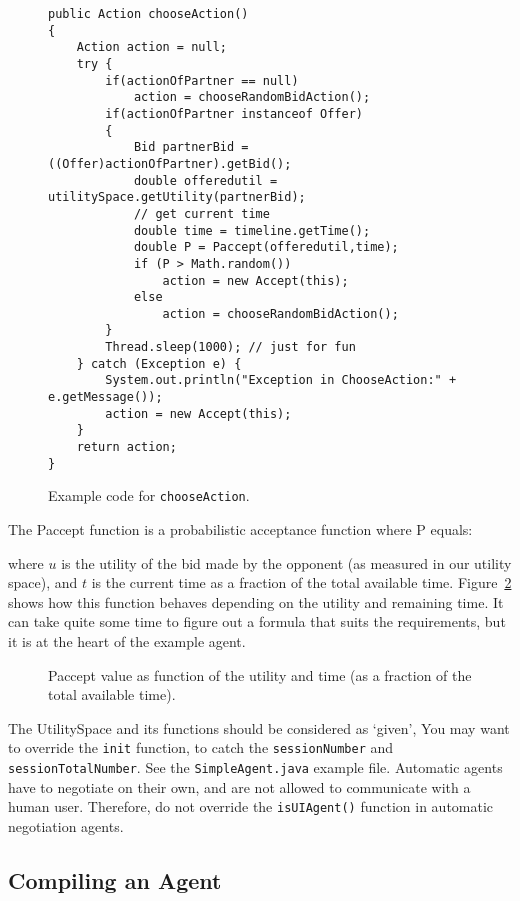 \documentclass[]{article}
\begin{document}
\begin{figure}
\begin{lstlisting}
public Action chooseAction()
{
	Action action = null;
	try { 
		if(actionOfPartner == null) 
			action = chooseRandomBidAction();
		if(actionOfPartner instanceof Offer)
		{
			Bid partnerBid = ((Offer)actionOfPartner).getBid();
			double offeredutil = utilitySpace.getUtility(partnerBid);
			// get current time
			double time = timeline.getTime();
			double P = Paccept(offeredutil,time);
			if (P > Math.random())
				action = new Accept(this);
			else
				action = chooseRandomBidAction();
		}
		Thread.sleep(1000); // just for fun
	} catch (Exception e) { 
		System.out.println("Exception in ChooseAction:" + e.getMessage());
		action = new Accept(this); 
	}
	return action;
}
\end{lstlisting}
\caption{Example code for \texttt{chooseAction}.}\label{Code:chooseAction}
\end{figure}

The Paccept function is a probabilistic acceptance function where P equals:

\begin{equation}
\end{equation}
where $u$ is the utility of the bid made by the opponent (as measured in our utility space), and $t$ is the current time as a fraction of the total available time. 
Figure~\ref{Fig:Paccept} shows how this function behaves depending on the utility and remaining time. It can take quite some time to figure out a formula that suits the requirements, but it is at the heart of the example agent.

\begin{figure}
\caption{Paccept value as function of the utility and time (as a fraction of the total available time).}\label{Fig:Paccept}
\end{figure}

The UtilitySpace and its functions should be considered as `given',  
You may want to override the \texttt{init} function, to catch the \texttt{sessionNumber} and \texttt{sessionTotalNumber}. See the \texttt{SimpleAgent.java} example file.
Automatic agents have to negotiate on their own, and are not allowed to communicate with a human user. Therefore, do not override the \texttt{isUIAgent()} function in automatic negotiation agents.

\subsection{Compiling an Agent}
\end{document}
